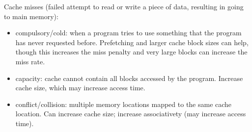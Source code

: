 \documentclass[12pt,twoside]{article}
\begin{document}
Cache misses (failed attempt to read or write a piece of data, resulting in going to main memory): 
\begin{itemize}
  \item compulsory/cold: when a program tries to use something that the program has never requested before. Prefetching and larger cache block sizes can help, though this increases the miss penalty and very large blocks can increase the miss rate.
  \item capacity: cache cannot contain all blocks accessed by the program. Increase cache size, which may increase access time. 
  \item conflict/collision: multiple memory locations mapped to the same cache location. Can increase cache size; increase associativety (may increase access time). 
\end{itemize}
\end{document}
